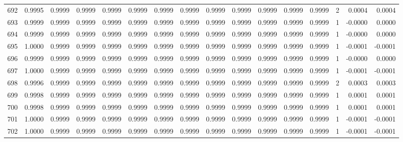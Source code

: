 \begin{tabular}{lrrrrrrrrrrrrrrr}
692 &      0.9995 &  0.9999 &  0.9999 &  0.9999 &  0.9999 &  0.9999 &  0.9999 &  0.9999 &  0.9999 &  0.9999 &   0.9999 &     0.9999 &      2 &                    0.0004 &                     0.0004 \\
693 &      0.9999 &  0.9999 &  0.9999 &  0.9999 &  0.9999 &  0.9999 &  0.9999 &  0.9999 &  0.9999 &  0.9999 &   0.9999 &     0.9999 &      1 &                   -0.0000 &                     0.0000 \\
694 &      0.9999 &  0.9999 &  0.9999 &  0.9999 &  0.9999 &  0.9999 &  0.9999 &  0.9999 &  0.9999 &  0.9999 &   0.9999 &     0.9999 &      1 &                   -0.0000 &                     0.0000 \\
695 &      1.0000 &  0.9999 &  0.9999 &  0.9999 &  0.9999 &  0.9999 &  0.9999 &  0.9999 &  0.9999 &  0.9999 &   0.9999 &     0.9999 &      1 &                   -0.0001 &                    -0.0001 \\
696 &      0.9999 &  0.9999 &  0.9999 &  0.9999 &  0.9999 &  0.9999 &  0.9999 &  0.9999 &  0.9999 &  0.9999 &   0.9999 &     0.9999 &      1 &                   -0.0000 &                     0.0000 \\
697 &      1.0000 &  0.9999 &  0.9999 &  0.9999 &  0.9999 &  0.9999 &  0.9999 &  0.9999 &  0.9999 &  0.9999 &   0.9999 &     0.9999 &      1 &                   -0.0001 &                    -0.0001 \\
698 &      0.9996 &  0.9999 &  0.9999 &  0.9999 &  0.9999 &  0.9999 &  0.9999 &  0.9999 &  0.9999 &  0.9999 &   0.9999 &     0.9999 &      2 &                    0.0003 &                     0.0003 \\
699 &      0.9998 &  0.9999 &  0.9999 &  0.9999 &  0.9999 &  0.9999 &  0.9999 &  0.9999 &  0.9999 &  0.9999 &   0.9999 &     0.9999 &      1 &                    0.0001 &                     0.0001 \\
700 &      0.9998 &  0.9999 &  0.9999 &  0.9999 &  0.9999 &  0.9999 &  0.9999 &  0.9999 &  0.9999 &  0.9999 &   0.9999 &     0.9999 &      1 &                    0.0001 &                     0.0001 \\
701 &      1.0000 &  0.9999 &  0.9999 &  0.9999 &  0.9999 &  0.9999 &  0.9999 &  0.9999 &  0.9999 &  0.9999 &   0.9999 &     0.9999 &      1 &                   -0.0001 &                    -0.0001 \\
702 &      1.0000 &  0.9999 &  0.9999 &  0.9999 &  0.9999 &  0.9999 &  0.9999 &  0.9999 &  0.9999 &  0.9999 &   0.9999 &     0.9999 &      1 &                   -0.0001 &                    -0.0001 \\

\end{tabular}
